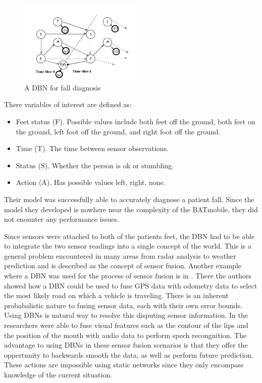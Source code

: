 \documentclass{article}
\begin{document}
\begin{figure}[here]
\begin{center}
\includegraphics[height=40mm]{figures/falldiagnosis.png}
\caption{A DBN for fall diagnosis}
\label{fig:falldiagnosis}
\end{center}
\end{figure}

There variables of interest are defined as:
\begin{itemize}
\item 
Feet status (F). Possible values include both feet off the ground, both feet on the ground, left foot off the ground, and right foot off the ground. 
\item 
Time (T). The time between sensor observations.
\item 
Status (S). Whether the person is ok or stumbling. 
\item
Action (A). Has possible values left, right, none. 
\end{itemize}

Their model was successfully able to accurately diagnose a patient fall. Since the model they developed is nowhere near the complexity of the BATmobile, they did not enounter any performance issues. 

Since sensors were attached to both of the patients feet, the DBN had to be able to integrate the two sensor readings into a single concept of the world. This is a general problem encountered in many areas from radar analysis to weather prediction and is described as the concept of sensor fusion. Another example where a DBN was used for the process of sensor fusion is in \cite{btxhak}. There the authors showed how a DBN could be used to fuse GPS data with odometry data to select the most likely road on which a vehicle is traveling. There is an inherent probabalistic nature to fusing sensor data, each with their own error bounds. Using DBNs is natural way to resolve this disputing sensor information. In \cite{murphyspeech} the researchers were able to fuse visual features such as the contour of the lips and the position of the mouth with audio data to perform spech recongnition. The advantage to using DBNs in these sensor fusion scenarios is that they offer the oppertunity to backwards smooth the data, as well as perform future prediction. These actions are impossible using static networks since they only encompass knowledge of the current situation. 
\end{document}
